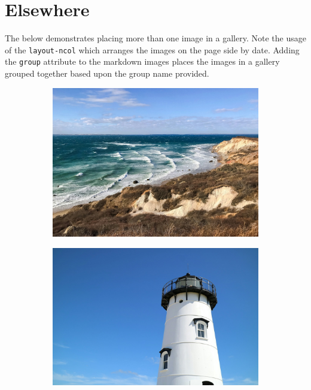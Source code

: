 \documentclass[
  a4paper,
  DIV=11,
  numbers=noendperiod,
  oneside,
  open=any]{scrreprt}
\begin{document}
\section{Elsewhere}\label{elsewhere}

The below demonstrates placing more than one image in a gallery. Note
the usage of the \texttt{layout-ncol} which arranges the images on the
page side by date. Adding the \texttt{group} attribute to the markdown
images places the images in a gallery grouped together based upon the
group name provided.

\begin{figure}

\begin{minipage}{0.50\linewidth}

\begin{figure}[H]

{\centering \includegraphics{images/mv-1.jpg}

}


\end{figure}%

\end{minipage}%
%
\begin{minipage}{0.50\linewidth}

\begin{figure}[H]

{\centering \includegraphics{images/mv-3.jpg}

}
\end{figure}
\end{minipage}
\end{figure}
\end{document}
